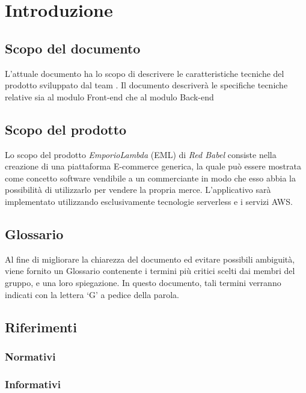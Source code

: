 \section{Introduzione}
\subsection{Scopo del documento}
L'attuale documento ha lo scopo di descrivere le caratteristiche tecniche del prodotto \nameproject{} sviluppato dal team \Omicron. Il documento descriverà le specifiche tecniche relative sia al modulo Front-end che al modulo Back-end
\subsection{Scopo del prodotto}
Lo scopo del prodotto \textit{EmporioLambda} (EML) di \textit{Red Babel} consiste nella creazione di una piattaforma E-commerce generica, la quale può essere mostrata come concetto software vendibile a un commerciante in modo che esso abbia la possibilità di utilizzarlo per vendere la propria merce. L'applicativo sarà implementato utilizzando esclusivamente tecnologie serverless e i servizi AWS.
\subsection{Glossario}
Al fine di migliorare la chiarezza del documento ed evitare possibili ambiguità, viene fornito un Glossario contenente i termini più critici scelti dai membri del gruppo, e una loro spiegazione. In questo documento, tali termini verranno indicati con la lettera `G' a pedice della parola.
\subsection{Riferimenti}
\subsubsection{Normativi}

\subsubsection{Informativi}
